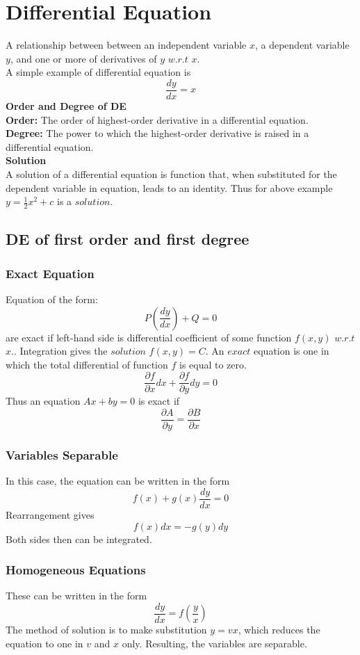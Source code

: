 \documentclass[twocolumn, 10pt]{article}
\begin{document}
\section{Differential Equation}
A relationship between between an independent variable $x$, a dependent variable $y$, and one or more of derivatives of $y$ $w.r.t$ $x$. \\
A simple example of differential equation is \\
$$\frac{dy}{dx}=x$$
\textbf{Order and Degree of DE}\\
\textbf{Order:} The order of highest-order derivative in a differential equation. \\
\textbf{Degree:} The power to which the highest-order derivative is raised in a differential equation.\\
\textbf{Solution}\\
A solution of a differential equation is function that, when substituted for the dependent variable in equation, leads to an identity. Thus for above example $y=\frac{1}{2}x^2+c$ is a $solution.$
\subsection{DE of first order and first degree}
\subsubsection{Exact Equation}
Equation of the form: $$P(\frac{dy}{dx})+	Q=0$$ are exact if left-hand side is differential coefficient of some function $f(x,y)$ $w.r.t$ $x.$. Integration gives the $solution$ $f(x,y)=C$. An $exact$ equation is one in which the total differential of function $f$ is equal to zero.
$$\frac{\partial f}{\partial x}dx+\frac{\partial f}{\partial y}dy=0$$
Thus an equation $Ax+by=0$ is exact if
$$\frac{\partial A}{\partial y}=\frac{\partial B}{\partial x}$$
\subsubsection{Variables Separable}
In this case, the equation can be written in the form $$f(x)+g(x)\frac{dy}{dx}=0$$ Rearrangement gives $$f(x)dx=-g(y)dy$$
Both sides then can be integrated.
\subsubsection{Homogeneous Equations}
These can be written in the form
$$\frac{dy}{dx}=f(\frac{y}{x})$$
The method of solution is to make substitution $y=vx$, which reduces the equation to one in $v$ and $x$ only. Resulting, the variables are separable.
\end{document}

